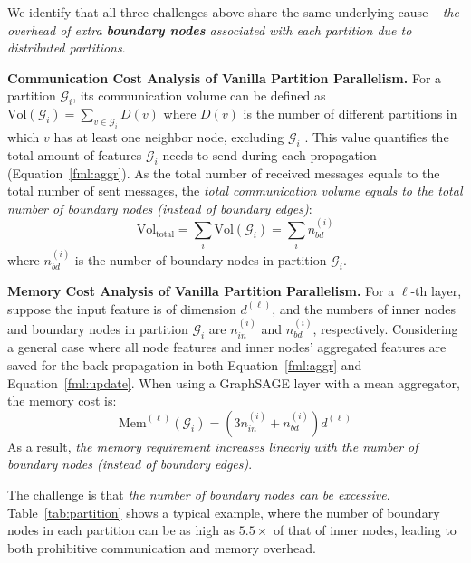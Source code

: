 \documentclass{article}
\newcommand{\niparagraph}[1]{\noindent\textbf{#1}}
\begin{document}
We identify that all three challenges above share the same underlying cause -- \textit{the overhead of extra \textbf{boundary nodes} associated with each partition due to distributed partitions}.


    
    




\niparagraph{Communication Cost Analysis of Vanilla Partition Parallelism.}
For a partition $\mathcal{G}_i$, its communication volume can be defined as $\text{Vol}(\mathcal{G}_i)=\sum_{v\in \mathcal{G}_i}D(v)$ where $D(v)$ is the number of different partitions in which $v$ has at least one neighbor node, excluding $\mathcal{G}_i$ \citep{bulucc2016recent}. 
This value quantifies the total amount of features $\mathcal{G}_i$ needs to send during each propagation (Equation~\ref{fml:aggr}). 
As the total number of received messages equals to the total number of sent messages, the \textit{total communication volume equals to the total number of boundary nodes (instead of boundary edges)}:
\begin{equation}
\text{Vol}_\text{total}=\sum_i\text{Vol}(\mathcal{G}_i)=\sum_in_{bd}^{(i)}\label{fml:comm}
\end{equation}
where $n_{bd}^{(i)}$ is the number of boundary nodes in partition $\mathcal{G}_i$.

\niparagraph{Memory Cost Analysis of Vanilla Partition Parallelism.}
For a $\ell$-th layer, suppose the input feature is of dimension $d^{(\ell)}$, and the numbers of inner nodes and boundary nodes in partition $\mathcal{G}_i$ are $n_{in}^{(i)}$ and $n_{bd}^{(i)}$, respectively.
Considering a general case where all node features and inner nodes' aggregated features are saved for the back propagation in both Equation~\ref{fml:aggr} and Equation~\ref{fml:update}. 
When using a GraphSAGE layer with a mean aggregator, the memory cost is:
\begin{equation}
\text{Mem}^{(\ell)}(\mathcal{G}_i)=(3n_{in}^{(i)}+n_{bd}^{(i)})d^{(\ell)}\label{fml:mem}
\end{equation}
As a result, \textit{the memory requirement increases linearly with the number of boundary nodes (instead of boundary edges)}.

The challenge is that \textit{the number of boundary nodes can be excessive}.
Table~\ref{tab:partition} shows a typical example, where
the number of boundary nodes in each partition can be as high as $5.5\times$ of that of inner nodes, leading to both prohibitive communication and memory overhead. 
\end{document}

